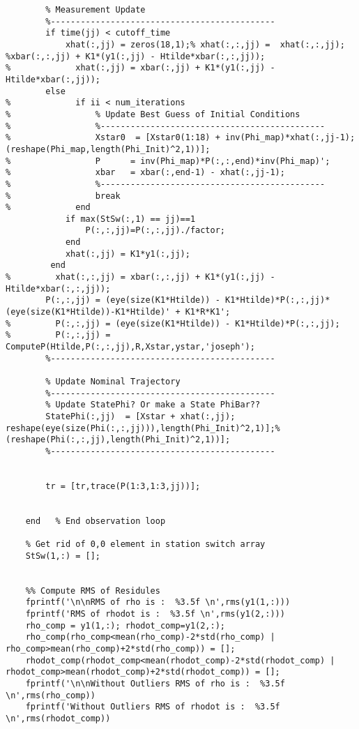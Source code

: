 \documentclass[12pt,a4paper,oneside]{article}
\numberwithin{equation}{section}   		%
\begin{document}
\begin{appendices}
\begin{lstlisting}
        % Measurement Update
        %---------------------------------------------
        if time(jj) < cutoff_time
            xhat(:,jj) = zeros(18,1);% xhat(:,:,jj) =  xhat(:,:,jj); %xbar(:,:,jj) + K1*(y1(:,jj) - Htilde*xbar(:,:,jj));
%             xhat(:,jj) = xbar(:,jj) + K1*(y1(:,jj) - Htilde*xbar(:,jj));
        else
%             if ii < num_iterations
%                 % Update Best Guess of Initial Conditions
%                 %---------------------------------------------
%                 Xstar0  = [Xstar0(1:18) + inv(Phi_map)*xhat(:,jj-1);(reshape(Phi_map,length(Phi_Init)^2,1))];
%                 P      = inv(Phi_map)*P(:,:,end)*inv(Phi_map)';
%                 xbar   = xbar(:,end-1) - xhat(:,jj-1);
%                 %---------------------------------------------
%                 break
%             end
            if max(StSw(:,1) == jj)==1
                P(:,:,jj)=P(:,:,jj)./factor;                
            end
            xhat(:,jj) = K1*y1(:,jj);
         end
%         xhat(:,:,jj) = xbar(:,:,jj) + K1*(y1(:,jj) - Htilde*xbar(:,:,jj));
        P(:,:,jj) = (eye(size(K1*Htilde)) - K1*Htilde)*P(:,:,jj)*(eye(size(K1*Htilde))-K1*Htilde)' + K1*R*K1';
%         P(:,:,jj) = (eye(size(K1*Htilde)) - K1*Htilde)*P(:,:,jj);
%         P(:,:,jj) = ComputeP(Htilde,P(:,:,jj),R,Xstar,ystar,'joseph');
        %---------------------------------------------
        
        % Update Nominal Trajectory
        %---------------------------------------------
        % Update StatePhi? Or make a State PhiBar??
        StatePhi(:,jj)  = [Xstar + xhat(:,jj); reshape(eye(size(Phi(:,:,jj))),length(Phi_Init)^2,1)];%(reshape(Phi(:,:,jj),length(Phi_Init)^2,1))];
        %---------------------------------------------
        

        tr = [tr,trace(P(1:3,1:3,jj))];
 
                                                               
    end   % End observation loop
    
    % Get rid of 0,0 element in station switch array
    StSw(1,:) = [];
        
    
    %% Compute RMS of Residules 
    fprintf('\n\nRMS of rho is :  %3.5f \n',rms(y1(1,:)))
    fprintf('RMS of rhodot is :  %3.5f \n',rms(y1(2,:)))
    rho_comp = y1(1,:); rhodot_comp=y1(2,:);
    rho_comp(rho_comp<mean(rho_comp)-2*std(rho_comp) | rho_comp>mean(rho_comp)+2*std(rho_comp)) = [];
    rhodot_comp(rhodot_comp<mean(rhodot_comp)-2*std(rhodot_comp) | rhodot_comp>mean(rhodot_comp)+2*std(rhodot_comp)) = [];
    fprintf('\n\nWithout Outliers RMS of rho is :  %3.5f \n',rms(rho_comp))
    fprintf('Without Outliers RMS of rhodot is :  %3.5f \n',rms(rhodot_comp))


\end{lstlisting}
\end{appendices}
\end{document}
